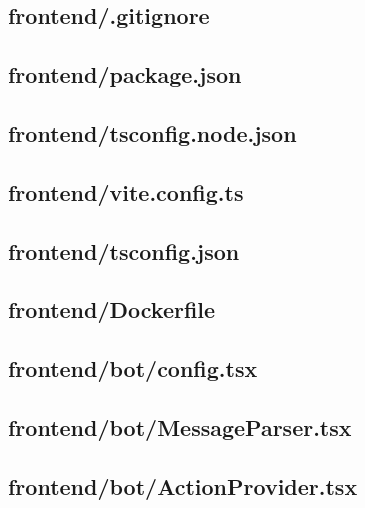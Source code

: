 \subsection*{frontend/.gitignore}


\subsection*{frontend/package.json}


\subsection*{frontend/tsconfig.node.json}


\subsection*{frontend/vite.config.ts}


\subsection*{frontend/tsconfig.json}


\subsection*{frontend/Dockerfile}


\subsection*{frontend/bot/config.tsx}


\subsection*{frontend/bot/MessageParser.tsx}


\subsection*{frontend/bot/ActionProvider.tsx}


